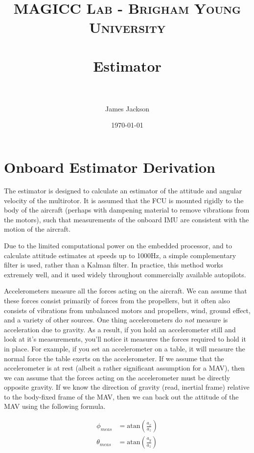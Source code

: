 \documentclass[paper=a4, fontsize=11pt]{scrartcl} %
\title{
\normalfont \normalsize
\textsc{MAGICC Lab - Brigham Young University} \\ [25pt] %
\horrule{0.5pt} \\[0.4cm] %
\huge Estimator \\ %
\horrule{2pt} \\[0.5cm] %
}
\author{James Jackson} %
\date{\normalsize\today} %
\numberwithin{equation}{section} %
\numberwithin{figure}{section} %
\numberwithin{table}{section} %
\begin{document}
\maketitle %


\section{Onboard Estimator Derivation}

The estimator is designed to calculate an estimator of the attitude and angular velocity of the multirotor.  It is assumed that the FCU is mounted rigidly to the body of the aircraft (perhaps with dampening material to remove vibrations from the motors), such that measurements of the onboard IMU are consistent with the motion of the aircraft.

Due to the limited computational power on the embedded processor, and to calculate attitude estimates at speeds up to 1000Hz, a simple complementary filter is used, rather than a Kalman filter.  In practice, this method works extremely well, and it used widely throughout commercially available autopilots.

Accelerometers measure all the forces acting on the aircraft.  We can assume that these forces consist primarily of forces from the propellers, but it often also consists of vibrations from unbalanced motors and propellers, wind, ground effect, and a variety of other sources. One thing accelerometers do \textit{not} measure is acceleration due to gravity.  As a result, if you hold an accelerometer still and look at it's measurements, you'll notice it measures the forces required to hold it in place.  For example, if you set an accelerometer on a table, it will measure the normal force the table exerts on the accelerometer.  If we assume that the accelerometer is at rest (albeit a rather significant assumption for a MAV), then we can assume that the forces acting on the accelerometer must be directly opposite gravity.  If we know the direction of gravity (read, inertial frame) relative to the body-fixed frame of the MAV, then we can back out the attitude of the MAV using the following formula.

\begin{equation}
	\begin{aligned}
		\phi_{meas} &= \textrm{atan} \left( \frac{a_x}{a_z} \right)  \\
		\theta_{meas} &= \textrm{atan} \left( \frac{a_y}{a_z}  \right)
	\end{aligned}
\end{equation}
\end{document}
